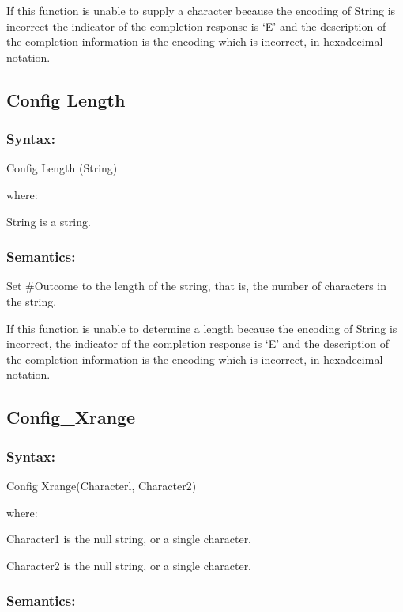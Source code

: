 If this function is unable to supply a character because the encoding of
String is incorrect the indicator of the completion response is `E' and
the description of the completion information is the encoding which is
incorrect, in hexadecimal notation.

\subsection{Config Length}\label{config-length}

\subsubsection{Syntax:}\label{syntax-8}

Config Length (String)

where:

String is a string.

\subsubsection{Semantics:}\label{semantics-9}

Set \#Outcome to the length of the string, that is, the number of
characters in the string.

If this function is unable to determine a length because the encoding of
String is incorrect, the indicator of the completion response is `E' and
the description of the completion information is the encoding which is
incorrect, in hexadecimal notation.

\subsection{Config\_Xrange}\label{config_xrange}

\subsubsection{Syntax:}\label{syntax-9}

Config Xrange(Characterl, Character2)

where:

Character1 is the null string, or a single character.

Character2 is the null string, or a single character.

\subsubsection{Semantics:}\label{semantics-10}


